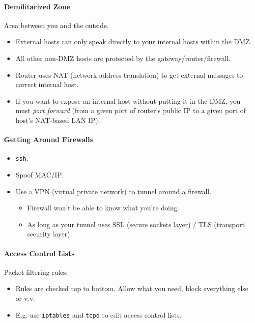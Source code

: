 \documentclass[twocolumn,english]{article}
\begin{document}
\paragraph{Demilitarized Zone}

Area between you and the outside.
\begin{itemize}
\item External hosts can only speak directly to your internal hosts within
the DMZ.
\item All other non-DMZ hosts are protected by the gateway/router/firewall.
\item Router uses NAT (network address translation) to get external messages
to correct internal host.
\item If you want to expose an internal host without putting it in the DMZ,
you must \emph{port forward} (from a given port of router's public
IP to a given port of host's NAT-based LAN IP).
\end{itemize}

\paragraph{Getting Around Firewalls}
\begin{itemize}
\item \texttt{ssh}.
\item Spoof MAC/IP.
\item Use a VPN (virtual private network) to tunnel around a firewall.
\begin{itemize}
\item Firewall won't be able to know what you're doing.
\item As long as your tunnel uses SSL (secure sockets layer) / TLS (transport
security layer).
\end{itemize}
\end{itemize}

\paragraph{Access Control Lists}

Packet filtering rules.
\begin{itemize}
\item Rules are checked top to bottom. Allow what you need, block everything
else or v.v.
\item E.g. use \texttt{iptables} and \texttt{tcpd} to edit access control
lists.
\end{itemize}
\end{document}
